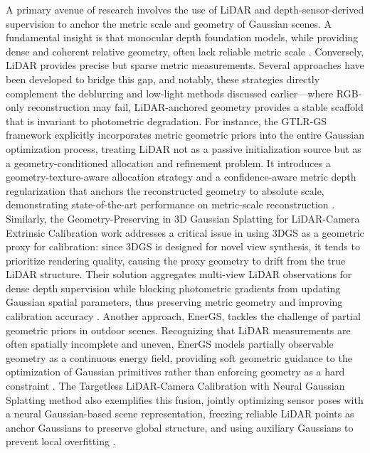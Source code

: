 \documentclass[11pt]{article}
\begin{document}
A primary avenue of research involves the use of LiDAR and depth-sensor-derived supervision to anchor the metric scale and geometry of Gaussian scenes. A fundamental insight is that monocular depth foundation models, while providing dense and coherent relative geometry, often lack reliable metric scale \cite{ref306,ref307}. Conversely, LiDAR provides precise but sparse metric measurements. Several approaches have been developed to bridge this gap, and notably, these strategies directly complement the deblurring and low-light methods discussed earlier---where RGB-only reconstruction may fail, LiDAR-anchored geometry provides a stable scaffold that is invariant to photometric degradation. For instance, the GTLR-GS framework explicitly incorporates metric geometric priors into the entire Gaussian optimization process, treating LiDAR not as a passive initialization source but as a geometry-conditioned allocation and refinement problem. It introduces a geometry-texture-aware allocation strategy and a confidence-aware metric depth regularization that anchors the reconstructed geometry to absolute scale, demonstrating state-of-the-art performance on metric-scale reconstruction \cite{ref308}. Similarly, the Geometry-Preserving in 3D Gaussian Splatting for LiDAR-Camera Extrinsic Calibration work addresses a critical issue in using 3DGS as a geometric proxy for calibration: since 3DGS is designed for novel view synthesis, it tends to prioritize rendering quality, causing the proxy geometry to drift from the true LiDAR structure. Their solution aggregates multi-view LiDAR observations for dense depth supervision while blocking photometric gradients from updating Gaussian spatial parameters, thus preserving metric geometry and improving calibration accuracy \cite{ref309}. Another approach, EnerGS, tackles the challenge of partial geometric priors in outdoor scenes. Recognizing that LiDAR measurements are often spatially incomplete and uneven, EnerGS models partially observable geometry as a continuous energy field, providing soft geometric guidance to the optimization of Gaussian primitives rather than enforcing geometry as a hard constraint \cite{ref194}. The Targetless LiDAR-Camera Calibration with Neural Gaussian Splatting method also exemplifies this fusion, jointly optimizing sensor poses with a neural Gaussian-based scene representation, freezing reliable LiDAR points as anchor Gaussians to preserve global structure, and using auxiliary Gaussians to prevent local overfitting \cite{ref310}.
\end{document}
